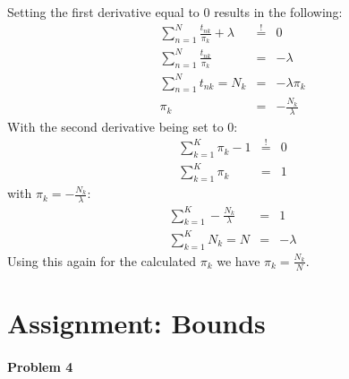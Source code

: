 \documentclass{article}
\begin{document}
Setting the first derivative equal to 0 results in the following:
\begin{eqnarray}
\sum_{n=1}^N  \frac{t_{nk}}{\pi_k} + \lambda &\overset{!}{=}& 0\\
\sum_{n=1}^N  \frac{t_{nk}}{\pi_k} &=& -\lambda\\
\sum_{n=1}^N t_{nk} = N_k &=& -\lambda \pi_k\\
\pi_k &=& -\frac{N_k}{\lambda}
\end{eqnarray}
With the second derivative being set to 0:
\begin{eqnarray}
\sum_{k=1}^K \pi_k - 1 &\overset{!}{=}& 0\\
\sum_{k=1}^K \pi_k &=& 1
\end{eqnarray}
with $\pi_k = -\frac{N_k}{\lambda}$:
\begin{eqnarray}
\sum_{k=1}^K -\frac{N_k}{\lambda} &=& 1\\
\sum_{k=1}^K N_k = N &=& -\lambda 
\end{eqnarray}
Using this again for the calculated $\pi_k$ we have $\pi_k = \frac{N_k}{N}$.


\section{Assignment: Bounds }
\paragraph*{Problem 4}
$\;$ 
\end{document}
